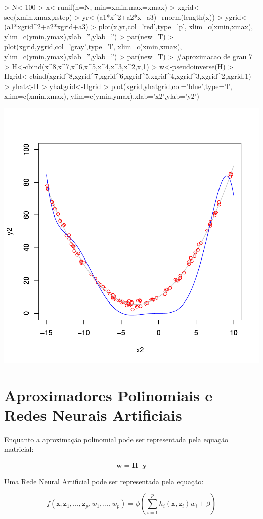 \documentclass{article}
\begin{document}
\begin{Schunk}
\begin{Sinput}
>   N<-100
>   x<-runif(n=N, min=xmin,max=xmax)
>   xgrid<-seq(xmin,xmax,xstep)
>   yr<-(a1*x^2+a2*x+a3)+rnorm(length(x))
>   ygrid<-(a1*xgrid^2+a2*xgrid+a3)
>   plot(x,yr,col='red',type='p', xlim=c(xmin,xmax), ylim=c(ymin,ymax),xlab='',ylab='')
>   par(new=T)
>   plot(xgrid,ygrid,col='gray',type='l', xlim=c(xmin,xmax), ylim=c(ymin,ymax),xlab='',ylab='')
>   par(new=T)
>   #aproximacao de grau 7
>   H<-cbind(x^8,x^7,x^6,x^5,x^4,x^3,x^2,x,1)
>   w<-pseudoinverse(H) %
>   Hgrid<-cbind(xgrid^8,xgrid^7,xgrid^6,xgrid^5,xgrid^4,xgrid^3,xgrid^2,xgrid,1)
>   yhat<-H%
>   yhatgrid<-Hgrid%
>   plot(xgrid,yhatgrid,col='blue',type='l', xlim=c(xmin,xmax), ylim=c(ymin,ymax),xlab='x2',ylab='y2')
\end{Sinput}
\end{Schunk}
\includegraphics{aproximacao_polinomial-017}


\newpage
\section{Aproximadores Polinomiais e Redes Neurais Artificiais}

Enquanto a aproximação polinomial pode ser representada pela equação matricial:

$$ \bm{w} = \bm{H^+} \bm{y} $$

Uma Rede Neural Artificial pode ser representada pela equação:

$$f(\texttt{x},\texttt{z}_1,...,\texttt{z}_p,w_1,...,w_p) = \phi (\sum_{i=1}^{p}h_i(\texttt{x},\texttt{z}_i)w_i + \beta)$$
\end{document}
